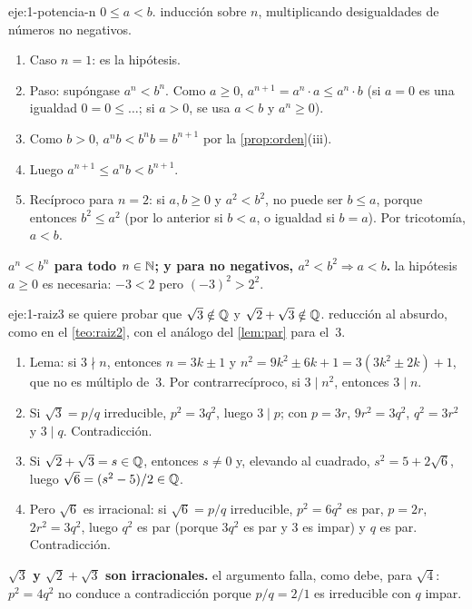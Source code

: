 \begin{solucion}{eje:1-potencia-n}
\datos $0\le a<b$.
\planteamiento inducción sobre $n$, multiplicando desigualdades de números no negativos.
\pasos
\begin{enumerate}[label=\arabic*.]
  \item Caso $n=1$: es la hipótesis.
  \item Paso: supóngase $a^n<b^n$. Como $a\ge0$, $a^{n+1}=a^n\cdot a\le a^n\cdot b$ (si $a=0$ es una igualdad $0=0\le\dots$; si $a>0$, se usa $a<b$ y $a^n\ge0$).
  \item Como $b>0$, $a^nb<b^nb=b^{n+1}$ por la \cref{prop:orden}(iii).
  \item Luego $a^{n+1}\le a^nb<b^{n+1}$.
  \item Recíproco para $n=2$: si $a,b\ge0$ y $a^2<b^2$, no puede ser $b\le a$, porque entonces $b^2\le a^2$ (por lo anterior si $b<a$, o igualdad si $b=a$). Por tricotomía, $a<b$.
\end{enumerate}
\resultado \textbf{$a^n<b^n$ para todo $n\in\mathbb{N}$; y para no negativos, $a^2<b^2\Rightarrow a<b$.}
\comprobacion la hipótesis $a\ge0$ es necesaria: $-3<2$ pero $(-3)^2>2^2$.
\end{solucion}

\begin{solucion}{eje:1-raiz3}
\datos se quiere probar que $\sqrt3\notin\mathbb{Q}$ y $\sqrt2+\sqrt3\notin\mathbb{Q}$.
\planteamiento reducción al absurdo, como en el \cref{teo:raiz2}, con el análogo del \cref{lem:par} para el~3.
\pasos
\begin{enumerate}[label=\arabic*.]
  \item Lema: si $3\nmid n$, entonces $n=3k\pm1$ y $n^2=9k^2\pm6k+1=3(3k^2\pm2k)+1$, que no es múltiplo de~3. Por contrarrecíproco, si $3\mid n^2$, entonces $3\mid n$.
  \item Si $\sqrt3=p/q$ irreducible, $p^2=3q^2$, luego $3\mid p$; con $p=3r$, $9r^2=3q^2$, $q^2=3r^2$ y $3\mid q$. Contradicción.
  \item Si $\sqrt2+\sqrt3=s\in\mathbb{Q}$, entonces $s\neq0$ y, elevando al cuadrado, $s^2=5+2\sqrt6$, luego $\sqrt6=(s^2-5)/2\in\mathbb{Q}$.
  \item Pero $\sqrt6$ es irracional: si $\sqrt6=p/q$ irreducible, $p^2=6q^2$ es par, $p=2r$, $2r^2=3q^2$, luego $q^2$ es par (porque $3q^2$ es par y 3 es impar) y $q$ es par. Contradicción.
\end{enumerate}
\resultado \textbf{$\sqrt3$ y $\sqrt2+\sqrt3$ son irracionales.}
\comprobacion el argumento falla, como debe, para $\sqrt4$: $p^2=4q^2$ no conduce a contradicción porque $p/q=2/1$ es irreducible con $q$ impar.
\end{solucion}

